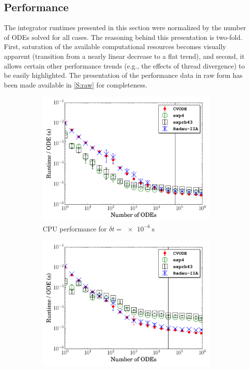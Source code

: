 \documentclass[preprint]{elsarticle}
\begin{document}
\subsection{Performance}
\label{S:perf}

The integrator runtimes presented in this section were normalized by the number of ODEs solved for all cases.
The reasoning behind this presentation is two-fold.
First, saturation of the available computational resources becomes visually apparent (transition from a nearly linear decrease to a flat trend), and second, it allows certain other performance trends (e.g., the effects of thread divergence) to be easily highlighted.
The presentation of the performance data in raw form has been made available in \ref{S:raw} for completeness.

\begin{figure}[htb]
  \centering
  \begin{subfigure}{0.49\textwidth}
      \includegraphics[width=\linewidth]{H2_1e-06_cpu.pdf}
      \caption{CPU performance for $\delta t = \SI{e-6}{\second}$}
      \label{F:h2_cpu_perf_small}
  \end{subfigure}
  \begin{subfigure}{0.49\textwidth}
      \includegraphics[width=\linewidth]{H2_1e-04_cpu.pdf}

\end{subfigure}
\end{figure}
\end{document}
